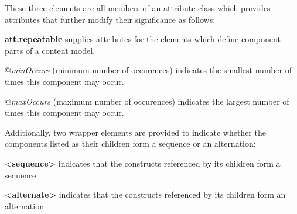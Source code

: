 These three elements are all members of an attribute class which provides attributes that further modify their significance as follows: 
\begin{sansreflist}
  
\item [\textbf{att.repeatable}] supplies attributes for the elements which define component parts of a content model.\hfil\\[-10pt]\begin{sansreflist}
    \item[@{\itshape minOccurs}]
  (minimum number of occurences) indicates the smallest number of times this component may occur.
    \item[@{\itshape maxOccurs}]
  (maximum number of occurences) indicates the largest number of times this component may occur.
\end{sansreflist}  
\end{sansreflist}
\par
Additionally, two wrapper elements are provided to indicate whether the components listed as their children form a sequence or an alternation: 
\begin{sansreflist}
  
\item [\textbf{<sequence>}] indicates that the constructs referenced by its children form a sequence
\item [\textbf{<alternate>}] indicates that the constructs referenced by its children form an alternation
\end{sansreflist}
